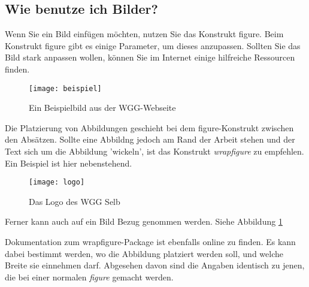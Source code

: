 \subsection{Wie benutze ich Bilder?}
Wenn Sie ein Bild einfügen möchten, nutzen Sie das Konstrukt figure. Beim Konstrukt figure gibt es einige Parameter, um dieses anzupassen.
Sollten Sie das Bild stark anpassen wollen, können Sie im Internet einige hilfreiche Ressourcen finden.
\begin{figure}[H]
    \centering
    \texttt{[image: beispiel]}
    \caption{Ein Beispielbild aus der WGG-Webseite}
    \label{fig:wallpaper}
\end{figure}
Die Platzierung von Abbildungen geschieht bei dem figure-Konstrukt zwischen den Absätzen. Sollte eine Abbildng jedoch am Rand der Arbeit stehen und der Text sich um die Abbildung 'wickeln',
ist das Konstrukt \emph{wrapfigure} zu empfehlen. Ein Beispiel ist hier nebenstehend.
\begin{wrapfigure}{r}{0.4\textwidth}
    \begin{center}
        \texttt{[image: logo]}
        \caption{Das Logo des WGG Selb}
    \end{center}
    \label{fig:logo}
\end{wrapfigure}

Ferner kann auch auf ein Bild Bezug genommen werden. Siehe Abbildung \ref{fig:wallpaper}

Dokumentation zum wrapfigure-Package ist ebenfalls online zu finden.
Es kann dabei bestimmt werden, wo die Abbildung platziert werden soll, und welche Breite sie einnehmen darf.
Abgesehen davon sind die Angaben identisch zu jenen, die bei einer normalen \emph{figure} gemacht werden.
